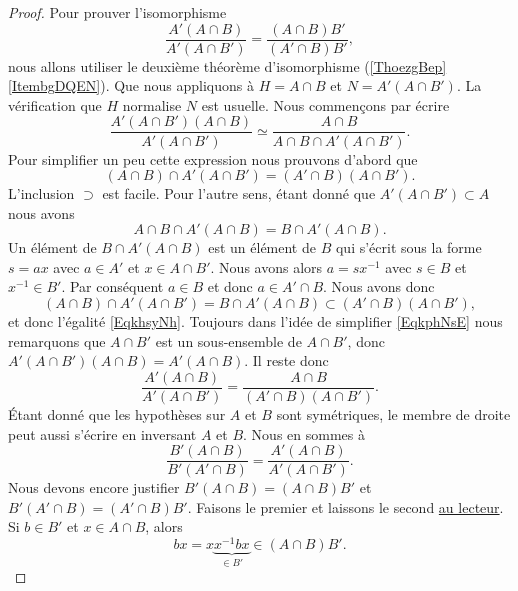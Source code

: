\begin{proof}
    Pour prouver l'isomorphisme
    \begin{equation}
        \frac{ A'(A\cap B) }{ A'(A\cap B') }=\frac{ (A\cap B)B' }{ (A'\cap B)B' },
    \end{equation}
    nous allons utiliser le deuxième théorème d'isomorphisme (\ref{ThoezgBep}\ref{ItembgDQEN}). Que nous appliquons à \( H=A\cap B\) et \( N=A'(A\cap B')\). La vérification que \( H\) normalise \( N\) est usuelle. Nous commençons par écrire
    \begin{equation}    \label{EqkphNsE}
        \frac{ A'(A\cap B')(A\cap B) }{ A'(A\cap B') }\simeq\frac{ A\cap B }{ A\cap B\cap A'(A\cap B') }.
    \end{equation}
    Pour simplifier un peu cette expression nous prouvons d'abord que
    \begin{equation}    \label{EqkhsyNh}
        (A\cap B)\cap A'(A\cap B')=(A'\cap B)(A\cap B').
    \end{equation}
    L'inclusion \( \supset\) est facile. Pour l'autre sens, étant donné que \( A'(A\cap B')\subset A\) nous avons
    \begin{equation}
        A\cap B\cap A'(A\cap B)=B\cap A'(A\cap B).
    \end{equation}
    Un élément de \( B\cap A'(A\cap B)\) est un élément de \(   B\) qui s'écrit sous la forme \( s=ax\) avec \( a\in A'\) et \( x\in A\cap B'\). Nous avons alors \( a=sx^{-1}\) avec \( s\in B\) et \( x^{-1} \in B'\). Par conséquent \( a\in B\) et donc \( a\in A'\cap B\). Nous avons donc
    \begin{equation}
        (A\cap B)\cap A'(A\cap B')=B\cap A'(A\cap B)\subset (A'\cap B)(A\cap B'),
    \end{equation}
    et donc l'égalité \eqref{EqkhsyNh}. Toujours dans l'idée de simplifier \eqref{EqkphNsE} nous remarquons que \( A\cap B'\) est un sous-ensemble de \( A\cap B'\), donc \( A'(A\cap B')(A\cap B)=A'(A\cap B)\). Il reste donc
    \begin{equation}
        \frac{ A'(A\cap B) }{ A'(A\cap B') }=\frac{ A\cap B }{ (A'\cap B)(A\cap B') }.
    \end{equation}
    Étant donné que les hypothèses sur \( A\) et \( B\) sont symétriques, le membre de droite peut aussi s'écrire en inversant \( A\) et \( B\). Nous en sommes à
    \begin{equation}
        \frac{ B'(A\cap B) }{ B'(A'\cap B) }=\frac{ A'(A\cap B) }{ A'(A\cap B') }.
    \end{equation}
    Nous devons encore justifier \( B'(A\cap B)=(A\cap B)B'\) et \( B'(A'\cap B)=(A'\cap B)B'\). Faisons le premier et laissons le second \href{https://abstrusegoose.com/395}{au lecteur}.
    Si \( b\in B'\) et \( x\in A\cap B\), alors
    \begin{equation}
        bx=x\underbrace{x^{-1}bx}_{\in B'}\in (A\cap B)B'.
    \end{equation}
\end{proof}

